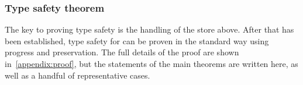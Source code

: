 \subsubsection{Type safety theorem}

The key to proving type safety is the handling of the store above. After that has been
established, type safety for \ourcalc{} can be proven in the standard way using
progress and preservation. The full details of the proof are shown in~\ref{appendix:proof},
but the statements of the main theorems are written here, as well as a handful
of representative cases.

\newcommand{\substlemmasubsts}[1]{\subst{#1}{\overharpoon{\var}}{\overharpoon{\VAL}} \subst{}{\overharpoon{\locreg{\loc}{\reg}}}{\overharpoon{\locreg{\loc'}{\reg'}}} \subst{}{\locreg{\loc}{\reg}}{\locreg{\loc'}{\reg'}}}


